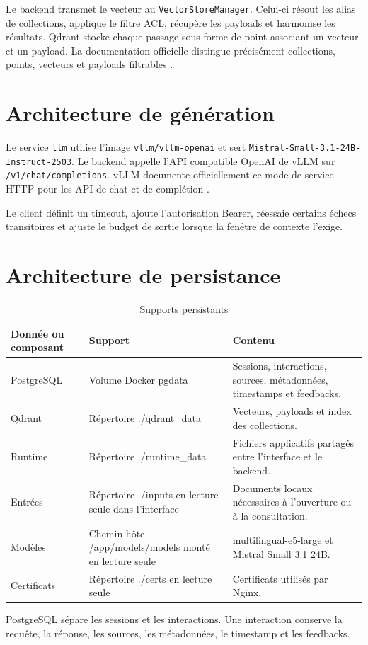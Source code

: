 Le backend transmet le vecteur au \texttt{VectorStoreManager}. Celui-ci résout les alias de collections, applique le filtre ACL, récupère les payloads et harmonise les résultats. Qdrant stocke chaque passage sous forme de point associant un vecteur et un payload. La documentation officielle distingue précisément collections, points, vecteurs et payloads filtrables \citep{QdrantDocs2026}.

\section{Architecture de génération}

Le service \texttt{llm} utilise l'image \texttt{vllm/vllm-openai} et sert \texttt{Mistral-Small-3.1-24B-Instruct-2503}. Le backend appelle l'API compatible OpenAI de vLLM sur \texttt{/v1/chat/completions}. vLLM documente officiellement ce mode de service HTTP pour les API de chat et de complétion \citep{VLLMDocs2026}.

Le client définit un timeout, ajoute l'autorisation Bearer, réessaie certains échecs transitoires et ajuste le budget de sortie lorsque la fenêtre de contexte l'exige.

\section{Architecture de persistance}

\begin{table}[H]
\centering
\caption{Supports persistants}
\label{tab:persistence_ch5}
\begin{tabular}{p{3.2cm}p{4.2cm}p{6.0cm}}
\toprule
\textbf{Donnée ou composant} & \textbf{Support} & \textbf{Contenu} \\
\midrule
PostgreSQL & Volume Docker pgdata & Sessions, interactions, sources, métadonnées, timestamps et feedbacks. \\
Qdrant & Répertoire ./qdrant\_data & Vecteurs, payloads et index des collections. \\
Runtime & Répertoire ./runtime\_data & Fichiers applicatifs partagés entre l’interface et le backend. \\
Entrées & Répertoire ./inputs en lecture seule dans l’interface & Documents locaux nécessaires à l’ouverture ou à la consultation. \\
Modèles & Chemin hôte /app/models/models monté en lecture seule & multilingual-e5-large et Mistral Small 3.1 24B. \\
Certificats & Répertoire ./certs en lecture seule & Certificats utilisés par Nginx. \\
\bottomrule
\end{tabular}
\end{table}

PostgreSQL sépare les sessions et les interactions. Une interaction conserve la requête, la réponse, les sources, les métadonnées, le timestamp et les feedbacks.
